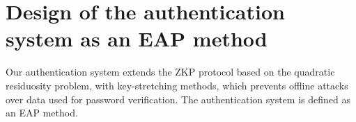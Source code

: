 \documentclass[12pt]{article}
\begin{document}
	\section{Design of the authentication system as an EAP method}
	Our authentication system extends the ZKP protocol based on the quadratic residuosity problem, with key-stretching methods, which prevents offline attacks over data used for password verification.
	The authentication system is defined as an EAP method.
	
	
	
\end{document}
